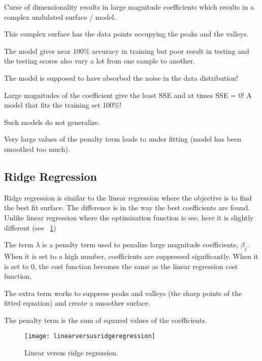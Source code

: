 	\begin{bulletedlist}
		\item Curse of dimensionality results in large magnitude coefficients which results in a complex undulated surface / model.
		\item This complex surface has the data points occupying the peaks and the valleys.
		\item The model gives near 100\% accuracy in training but poor result in testing and the testing scores also vary a lot from one sample to another.
		\item The model is supposed to have absorbed the noise in the data distribution!
		\item Large magnitudes of the coefficient give the least SSE and at times SSE = 0! A model that fits the training set 100\%!
		\item Such models do not generalize.
		\item Very large values of the penalty term leads to under fitting (model has been smoothed too much).
	\end{bulletedlist}

	\subsection{Ridge Regression}
	\begin{bulletedlist}
		\item Ridge regression is similar to the linear regression where the objective is to find the best fit surface. The difference is in the way the best coefficients are found. Unlike linear regression where the optimization function is \gls{sse}, here it is slightly different (see \figurename~\ref{fig:linearversusridgeregression})
		\item The term $\lambda$ is a penalty term used to penalize large magnitude coefficients, $\beta_j$.  When it is set to a high number, coefficients are suppressed significantly.  When it is set to 0, the cost function becomes the same as the linear regression cost function.
		\item The extra term works to suppress peaks and valleys (the sharp points of the fitted equation) and create a smoother surface.
		\item The penalty term is the sum of squared values of the coefficients.
	\end{bulletedlist}

	\begin{figure}[tbh]
		\centering
		\texttt{[image: linearversusridgeregression]}
		\caption[Linear versus ridge regression]{Linear versus ridge regression.}
		\label{fig:linearversusridgeregression}
	\end{figure}

